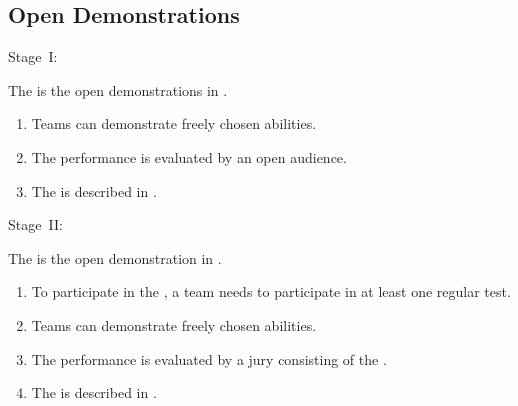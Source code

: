\subsection{Open Demonstrations}
\label{sec:open-demonstrations}
\begin{enumerate}
	{\bf\item Stage~I:} The  is the open demonstrations in .
	\begin{enumerate}
		\item Teams can demonstrate freely chosen abilities. 
		\item The performance is evaluated by an open audience.
		\item The  is described in .
	\end{enumerate}

	{\bf\item Stage~II:} The  is the open demonstration in .
	\begin{enumerate}
		\item To participate in the , a team needs to participate in at least one regular  test.
		\item Teams can demonstrate freely chosen abilities. 
		\item The performance is evaluated by a jury consisting of the .
		\item The  is described in .
	\end{enumerate}

	

\end{enumerate}
